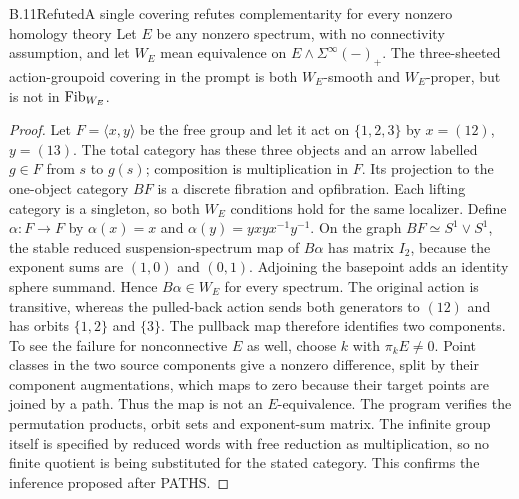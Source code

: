 \begin{claim}{B.11}{Refuted}{A single covering refutes complementarity for every nonzero homology theory}
Let $E$ be any nonzero spectrum, with no connectivity assumption, and let
$W_E$ mean equivalence on $E\wedge\Sigma^\infty(-)_+$.
The three-sheeted action-groupoid covering in the prompt is both
$W_E$-smooth and $W_E$-proper, but is not in $\mathrm{Fib}_{W_E}$.
\end{claim}
\begin{proof}
Let $F=\langle x,y\rangle$ be the free group and let it act on
$\{1,2,3\}$ by $x=(12)$, $y=(13)$. The total category has these three
objects and an arrow labelled $g\in F$ from $s$ to $g(s)$; composition is
multiplication in $F$. Its projection to the one-object category $BF$ is
a discrete fibration and opfibration. Each lifting category is a singleton,
so both $W_E$ conditions hold for the same localizer.
Define $\alpha:F\to F$ by $\alpha(x)=x$ and
$\alpha(y)=yxyx^{-1}y^{-1}$. On the graph $BF\simeq S^1\vee S^1$, the
stable reduced suspension-spectrum map of $B\alpha$ has matrix $I_2$,
because the exponent sums are $(1,0)$ and $(0,1)$. Adjoining the basepoint
adds an identity sphere summand. Hence $B\alpha\in W_E$ for every spectrum.
The original action is transitive, whereas the pulled-back action sends
both generators to $(12)$ and has orbits $\{1,2\}$ and $\{3\}$.
The pullback map therefore identifies two components. To see the failure
for nonconnective $E$ as well, choose $k$ with $\pi_kE\ne0$. Point classes
in the two source components give a nonzero difference, split by their
component augmentations, which maps to zero because their target points
are joined by a path. Thus the map is not an $E$-equivalence.
The program verifies the permutation products, orbit sets and exponent-sum
matrix. The infinite group itself is specified by reduced words with free
reduction as multiplication, so no finite quotient is being substituted for
the stated category. This confirms the inference proposed after PATHS.
\end{proof}

